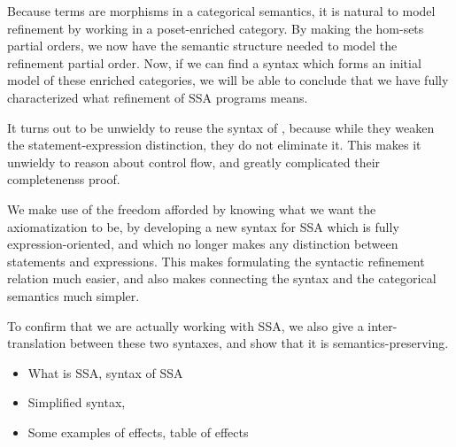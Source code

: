 \documentclass[acmsmall,screen,review]{acmart}
\begin{document}
Because terms are morphisms in a categorical semantics, it is natural to model refinement by working in a poset-enriched category. By making the hom-sets partial orders, we now have the semantic structure needed to model the refinement partial order. Now, if we can find a syntax which forms an initial model of these enriched categories, we will be able to conclude that we have fully characterized what refinement of SSA programs means. 

It turns out to be unwieldy to reuse the syntax of \cite{ghalayini-24-ssa-densem-arxiv}, because while they weaken the statement-expression distinction, they do not eliminate it. This makes it unwieldy to reason about control flow, and greatly complicated their completenenss proof.

We make use of the freedom afforded by knowing what we want the axiomatization to be, by developing a new syntax for SSA which is fully expression-oriented, and which no longer makes any distinction between statements and expressions. This makes formulating the syntactic refinement relation much easier, and also makes connecting the syntax and the categorical semantics  much simpler. 

To confirm that we are actually working with SSA, we also give a inter-translation between these two syntaxes, and show that it is semantics-preserving. 




\begin{itemize}
  \item What is SSA, syntax of SSA
  \item Simplified syntax, \citet{ghalayini-24-ssa-densem-arxiv}
  \item Some examples of effects, table of effects
\end{itemize}
\end{document}
